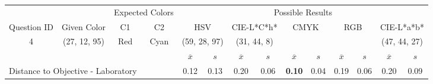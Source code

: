 \begin{table}[H]
  \resizebox{\textwidth}{!} {
  \begin{tabular}{lccccccccccccc}
    \hline
    \multicolumn{1}{c}{}                              &                                      & \multicolumn{2}{c}{Expected Colors}                   & \multicolumn{10}{c}{Possible Results}                                                                                                                                                                                                                                                                                        \\ \cline{3-14}
    \multicolumn{1}{c}{\multirow{-2}{*}{Question ID}} & \multirow{-2}{*}{Given Color}        & C1                       & C2                         & \multicolumn{2}{c}{HSV}                                        & \multicolumn{2}{c}{CIE-L*C*h*}                                 & \multicolumn{2}{c}{CMYK}                                       & \multicolumn{2}{c}{RGB}                                        & \multicolumn{2}{c}{CIE-L*a*b*}                                 \\ \hline
    \multicolumn{1}{c}{4}                             & \cellcolor[HTML]{7F00FF}(27, 12, 95) & \multicolumn{1}{c|}{Red} & \multicolumn{1}{c|}{Cyan}  & \multicolumn{2}{c|}{\cellcolor[HTML]{FF00FF}(59, 28, 97)}      & \multicolumn{2}{c|}{\cellcolor[HTML]{91C01D}(31, 44, 8)}       & \multicolumn{2}{c|}{\cellcolor[HTML]{808080}{\color[HTML]{FFFFFF}(21, 22, 24)}}       & \multicolumn{2}{c|}{\cellcolor[HTML]{808080}{\color[HTML]{FFFFFF}(21, 22, 24)}}       & \multicolumn{2}{c|}{\cellcolor[HTML]{DDA581}(47, 44, 27)}       \\ \hline
                                                      & \multicolumn{1}{l}{}                 & \multicolumn{1}{l}{}     & \multicolumn{1}{l}{}       & \multicolumn{1}{c}{$\overline{x}$} & \multicolumn{1}{c}{$s$} & \multicolumn{1}{c}{$\overline{x}$} & \multicolumn{1}{c}{$s$} & \multicolumn{1}{c}{$\overline{x}$} & \multicolumn{1}{c}{$s$} & \multicolumn{1}{c}{$\overline{x}$} & \multicolumn{1}{c}{$s$} & \multicolumn{1}{c}{$\overline{x}$} & \multicolumn{1}{c}{$s$} \\ \hline
    \multicolumn{4}{l}{Distance to Objective - Laboratory}                                                                                           & \multicolumn{1}{|c}{0.12}       & \multicolumn{1}{c|}{0.13}    & \multicolumn{1}{|c}{0.20}       & \multicolumn{1}{c|}{0.06}    & \multicolumn{1}{|c}{\textbf{0.10}}         & \multicolumn{1}{c|}{0.04}    & \multicolumn{1}{|c}{0.19}       & \multicolumn{1}{c|}{0.06}    & \multicolumn{1}{|c}{0.20}       & \multicolumn{1}{c|}{0.09}    \\

\end{tabular}}
\end{table}
